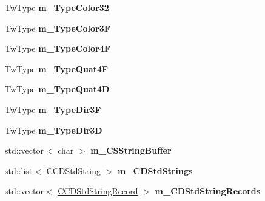 \begin{DoxyCompactItemize}
\item 
\hypertarget{struct_c_tw_mgr_a2ddf338d105d2f53a2ab47d06e8189df}{Tw\+Type {\bfseries m\+\_\+\+Type\+Color32}}\label{struct_c_tw_mgr_a2ddf338d105d2f53a2ab47d06e8189df}

\item 
\hypertarget{struct_c_tw_mgr_a8a1543271a912fe78eaa0e0142572242}{Tw\+Type {\bfseries m\+\_\+\+Type\+Color3\+F}}\label{struct_c_tw_mgr_a8a1543271a912fe78eaa0e0142572242}

\item 
\hypertarget{struct_c_tw_mgr_a8ebf9db3f3e265e80b34b524132a76dd}{Tw\+Type {\bfseries m\+\_\+\+Type\+Color4\+F}}\label{struct_c_tw_mgr_a8ebf9db3f3e265e80b34b524132a76dd}

\item 
\hypertarget{struct_c_tw_mgr_a537103069ed7d5b9c00eef471f0e03db}{Tw\+Type {\bfseries m\+\_\+\+Type\+Quat4\+F}}\label{struct_c_tw_mgr_a537103069ed7d5b9c00eef471f0e03db}

\item 
\hypertarget{struct_c_tw_mgr_a93eefe3cfc40b9832dd275c7cdc80af0}{Tw\+Type {\bfseries m\+\_\+\+Type\+Quat4\+D}}\label{struct_c_tw_mgr_a93eefe3cfc40b9832dd275c7cdc80af0}

\item 
\hypertarget{struct_c_tw_mgr_a4f99eaa008b0927c1995f9eb0f1ddd4c}{Tw\+Type {\bfseries m\+\_\+\+Type\+Dir3\+F}}\label{struct_c_tw_mgr_a4f99eaa008b0927c1995f9eb0f1ddd4c}

\item 
\hypertarget{struct_c_tw_mgr_ac1ff228381cdae2f23ebab43b5cbaeb7}{Tw\+Type {\bfseries m\+\_\+\+Type\+Dir3\+D}}\label{struct_c_tw_mgr_ac1ff228381cdae2f23ebab43b5cbaeb7}

\item 
\hypertarget{struct_c_tw_mgr_ad9c28672bbffbf3d7ff32b32c2d35eed}{std\+::vector$<$ char $>$ {\bfseries m\+\_\+\+C\+S\+String\+Buffer}}\label{struct_c_tw_mgr_ad9c28672bbffbf3d7ff32b32c2d35eed}

\item 
\hypertarget{struct_c_tw_mgr_a08a1cc2f52b5f26ec0afcdb23a858447}{std\+::list$<$ \hyperlink{struct_c_tw_mgr_1_1_c_c_d_std_string}{C\+C\+D\+Std\+String} $>$ {\bfseries m\+\_\+\+C\+D\+Std\+Strings}}\label{struct_c_tw_mgr_a08a1cc2f52b5f26ec0afcdb23a858447}

\item 
\hypertarget{struct_c_tw_mgr_a28a936e0c111b1320d4bd73ece75fc7f}{std\+::vector$<$ \hyperlink{struct_c_tw_mgr_1_1_c_c_d_std_string_record}{C\+C\+D\+Std\+String\+Record} $>$ {\bfseries m\+\_\+\+C\+D\+Std\+String\+Records}}\label{struct_c_tw_mgr_a28a936e0c111b1320d4bd73ece75fc7f}


\end{DoxyCompactItemize}
